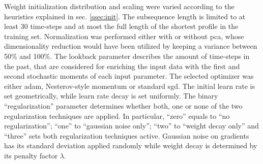 Weight initialization distribution and scaling were varied according to the heuristics explained in sec. \ref{ssec:init}.
The subsequence length is limited to at least 30 time-steps and at most the full length of the shortest profile in the training set.
Normalization was performed either with or without \gls{pca}, whose dimensionality reduction would have been utilized by keeping a variance between 50\% and 100\%.
The lookback parameter describes the amount of time-steps in the past, that are considered for enriching the input data with the first and second stochastic moments of each input parameter.
The selected optimizer was either \gls{adam}, Nesterov-style momentum or standard \gls{sgd}.
The initial learn rate is set geometrically, while learn rate decay is set uniformly.
The binary ``regularization'' parameter determines whether both, one or none of the two regularization techniques are applied.
In particular, ``zero'' equals to ``no regularization''; ``one'' to ``gaussian noise only''; ``two'' to ``weight decay only'' and ``three'' sets both regularization techniques active.
Gaussian noise on gradients has its standard deviation applied randomly while weight decay is determined by its penalty factor $\lambda$.

